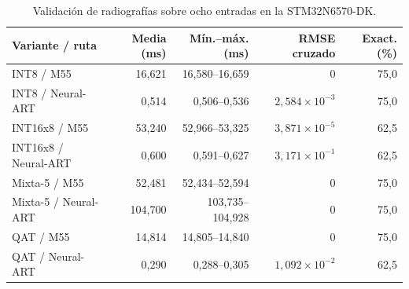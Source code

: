 \begin{table}[H]
\centering\small
\caption{Validación de radiografías sobre ocho entradas en la STM32N6570-DK.}\label{tab:rx_placa}
\begin{tabularx}{\linewidth}{Yrrrr}\toprule
Variante / ruta & Media (ms) & Mín.--máx. (ms) & RMSE cruzado & Exact. (\%)\\\midrule
INT8 / M55 & 16,621 & 16,580--16,659 & 0 & 75,0\\
INT8 / Neural-ART & 0,514 & 0,506--0,536 & $2,584\times10^{-3}$ & 75,0\\
INT16x8 / M55 & 53,240 & 52,966--53,325 & $3,871\times10^{-5}$ & 62,5\\
INT16x8 / Neural-ART & 0,600 & 0,591--0,627 & $3,171\times10^{-1}$ & 62,5\\
Mixta-5 / M55 & 52,481 & 52,434--52,594 & 0 & 75,0\\
Mixta-5 / Neural-ART & 104,700 & 103,735--104,928 & 0 & 75,0\\
QAT / M55 & 14,814 & 14,805--14,840 & 0 & 75,0\\
QAT / Neural-ART & 0,290 & 0,288--0,305 & $1,092\times10^{-2}$ & 62,5\\
\bottomrule\end{tabularx}
\end{table}
